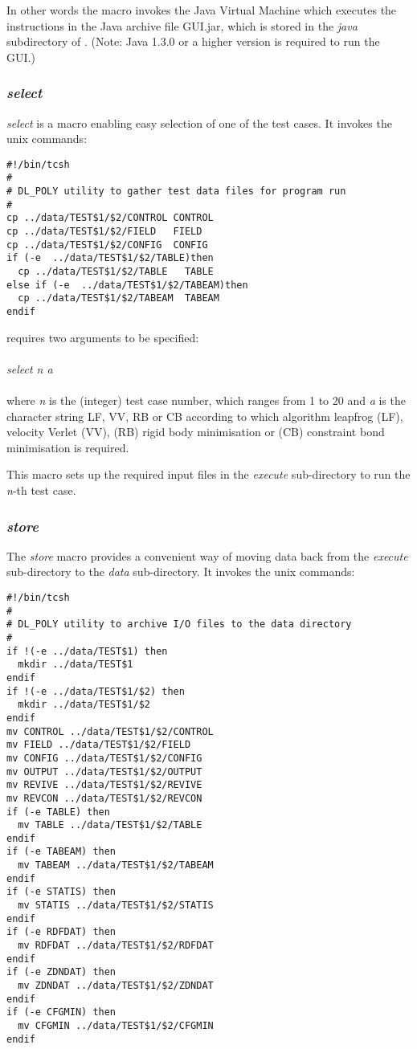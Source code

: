 In other words the macro invokes the Java Virtual Machine which
executes the instructions in the Java archive file GUI.jar, which is
stored in the {\em java} subdirectory of \D{}. (Note: Java 1.3.0 or a
higher version is required to run the GUI.)

\subsubsection{{\sl select}}

{\sl select} is a macro enabling easy selection of one of the test
cases. It invokes the unix commands:

\begin{verbatim}
#!/bin/tcsh
#
# DL_POLY utility to gather test data files for program run
#
cp ../data/TEST$1/$2/CONTROL CONTROL
cp ../data/TEST$1/$2/FIELD   FIELD
cp ../data/TEST$1/$2/CONFIG  CONFIG
if (-e  ../data/TEST$1/$2/TABLE)then
  cp ../data/TEST$1/$2/TABLE   TABLE
else if (-e  ../data/TEST$1/$2/TABEAM)then
  cp ../data/TEST$1/$2/TABEAM  TABEAM
endif
\end{verbatim}
 requires two arguments to be specified:\\~\\
{\sl select n a}\\~\\
\noindent where {\sl n} is the (integer) test case number, which
ranges from 1 to 20 and {\sl a} is the character string LF, VV, RB or
CB according to which algorithm leapfrog (LF), velocity Verlet (VV),
(RB) rigid body minimisation or (CB) constraint bond minimisation is
required.

This macro sets up the required input files in the {\em execute}
sub-directory to run the {\sl n}-th test case.

\subsubsection{{\sl store}}

The {\sl store} macro provides a convenient way of moving data back
from the {\em execute} sub-directory to the {\em
data} sub-directory. It invokes the unix
commands:

\begin{verbatim}
#!/bin/tcsh
#
# DL_POLY utility to archive I/O files to the data directory
#
if !(-e ../data/TEST$1) then
  mkdir ../data/TEST$1
endif
if !(-e ../data/TEST$1/$2) then
  mkdir ../data/TEST$1/$2
endif
mv CONTROL ../data/TEST$1/$2/CONTROL
mv FIELD ../data/TEST$1/$2/FIELD
mv CONFIG ../data/TEST$1/$2/CONFIG
mv OUTPUT ../data/TEST$1/$2/OUTPUT
mv REVIVE ../data/TEST$1/$2/REVIVE
mv REVCON ../data/TEST$1/$2/REVCON
if (-e TABLE) then
  mv TABLE ../data/TEST$1/$2/TABLE
endif
if (-e TABEAM) then
  mv TABEAM ../data/TEST$1/$2/TABEAM
endif
if (-e STATIS) then
  mv STATIS ../data/TEST$1/$2/STATIS
endif
if (-e RDFDAT) then
  mv RDFDAT ../data/TEST$1/$2/RDFDAT
endif
if (-e ZDNDAT) then
  mv ZDNDAT ../data/TEST$1/$2/ZDNDAT
endif
if (-e CFGMIN) then
  mv CFGMIN ../data/TEST$1/$2/CFGMIN
endif
\end{verbatim}

